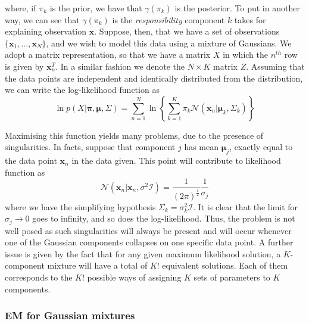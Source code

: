 \documentclass[a4paper]{article}
\begin{document}
 	where, if $\pi_{k}$ is the prior, we have that $\gamma(\pi_{k})$ is the posterior. To put in another way, we can see that $\gamma(\pi_{k})$ is the \textit{responsibility} component $k$ takes for explaining observation $\boldsymbol{x}$.
 	Suppose, then, that we have a set of observations $\{ \boldsymbol{x}_{1}, ..., \boldsymbol{x}_{N} \} $, and we wish to model this data using a mixture of Gaussians. We adopt a matrix representation, so that we have a matrix $X$ in which the $n^{th}$ row is given by $\boldsymbol{x}_{n}^{T}$. In a similar fashion we denote the $N \times K$ matrix $Z$. Assuming that the data points are independent and identically distributed from the distribution, we can write the log-likelihood function as
 	\begin{equation*}
 	\ln p \left( X | \boldsymbol{\pi}, \boldsymbol{\mu}, \Sigma \right)
 	= \sum_{n=1}^{N} \ln \left\{ \sum_{k=1}^{K} \pi_{k} \mathcal{N} \left( \boldsymbol{x}_{n} | \boldsymbol{\mu}_{k}, \Sigma_{k} \right) \right\}
 	\end{equation*}
 	
 	Maximising this function yields many problems, due to the presence of singularities. In facts, suppose that component $j$ has mean $\boldsymbol{\mu}_{j}$, exactly equal to the data point $\boldsymbol{x}_{n}$ in the data given. This point will contribute to likelihood function as
 	\begin{equation*}
 	\mathcal{N} \left( \boldsymbol{x}_{n} | \boldsymbol{x}_{n}, \sigma^{2} \mathcal{I} \right)
 	= \frac{1}{ \left(2 \pi \right)^{\frac{1}{2}}} \frac{1}{\sigma_{j}}
 	\end{equation*}
 	where we have the simplifying hypothesis $\Sigma_{k} = \sigma_{k}^{2} \mathcal{I}$. It is clear that the limit for $\sigma_{j} \to 0$ goes to infinity, and so does the log-likelihood. Thus, the problem is not well posed as such singularities will always be present and will occur whenever one of the Gaussian components collapses on one specific data point.
 	A further issue is given by the fact that for any given maximum likelihood solution, a $K$-component mixture will have a total of $K!$ equivalent solutions. Each of them corresponds to the $K!$ possible ways of assigning $K$ sets of parameters to $K$ components.
 	\subsubsection{EM for Gaussian mixtures}
 	
	
		
\end{document}
